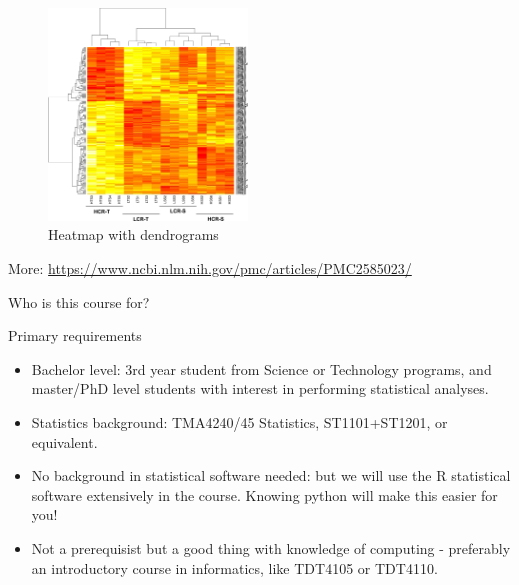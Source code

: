 \documentclass[10pt,ignorenonframetext,]{beamer}
\begin{document}
\begin{frame}

\begin{figure}
\includegraphics[width=150pt]{heatmap} \caption{Heatmap with dendrograms}\label{fig:heatmap_pic}
\end{figure}

\tiny
More: \url{https://www.ncbi.nlm.nih.gov/pmc/articles/PMC2585023/}

\end{frame}

\begin{frame}{Who is this course for?}

\begin{block}{Primary requirements}

\begin{itemize}
\item
  Bachelor level: 3rd year student from Science or Technology programs,
  and master/PhD level students with interest in performing statistical
  analyses.
\item
  Statistics background: TMA4240/45 Statistics, ST1101+ST1201, or
  equivalent.
\item
  No background in statistical software needed: but we will use the R
  statistical software extensively in the course. Knowing python will
  make this easier for you!
\item
  Not a prerequisist but a good thing with knowledge of computing -
  preferably an introductory course in informatics, like TDT4105 or
  TDT4110.
\end{itemize}

\end{block}

\end{frame}
\end{document}
